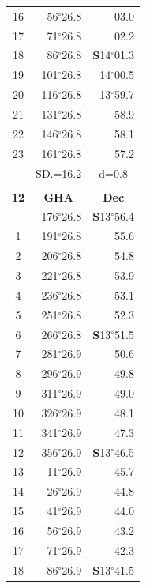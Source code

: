 \documentclass[10pt, a4paper]{report}
\begin{document}
\begin{scriptsize}
\begin{tabular*}{0.2\textwidth}[t]{@{\extracolsep{\fill}}|c|rr|}
16 & 56$^\circ$26.8 & 03.0\\
17 & 71$^\circ$26.8 & 02.2\\[2Pt]
18 & 86$^\circ$26.8 & \textbf{S}14$^\circ$01.3\\
19 & 101$^\circ$26.8 & 14$^\circ$00.5\\
20 & 116$^\circ$26.8 & 13$^\circ$59.7\\
21 & 131$^\circ$26.8 & \raisebox{0.24ex}{\boldmath$\cdot$~\boldmath$\cdot$~~}58.9\\
22 & 146$^\circ$26.8 & 58.1\\
23 & 161$^\circ$26.8 & 57.2\\
\hline
\rule{0pt}{2.4ex} & \multicolumn{1}{c}{SD.=16.2} & \multicolumn{1}{c|}{d=0.8}\\
\hline
\multicolumn{1}{c}{}\\[-0.5ex]\hline
\multicolumn{1}{|c|}{\rule{0pt}{2.6ex}\textbf{12}} & \multicolumn{1}{c}{\textbf{GHA}} & \multicolumn{1}{c|}{\textbf{Dec}}\\
\hline\rule{0pt}{2.6ex}\noindent
0 & 176$^\circ$26.8 & \textbf{S}13$^\circ$56.4\\
1 & 191$^\circ$26.8 & 55.6\\
2 & 206$^\circ$26.8 & 54.8\\
3 & 221$^\circ$26.8 & \raisebox{0.24ex}{\boldmath$\cdot$~\boldmath$\cdot$~~}53.9\\
4 & 236$^\circ$26.8 & 53.1\\
5 & 251$^\circ$26.8 & 52.3\\[2Pt]
6 & 266$^\circ$26.8 & \textbf{S}13$^\circ$51.5\\
7 & 281$^\circ$26.9 & 50.6\\
8 & 296$^\circ$26.9 & 49.8\\
9 & 311$^\circ$26.9 & \raisebox{0.24ex}{\boldmath$\cdot$~\boldmath$\cdot$~~}49.0\\
10 & 326$^\circ$26.9 & 48.1\\
11 & 341$^\circ$26.9 & 47.3\\[2Pt]
12 & 356$^\circ$26.9 & \textbf{S}13$^\circ$46.5\\
13 & 11$^\circ$26.9 & 45.7\\
14 & 26$^\circ$26.9 & 44.8\\
15 & 41$^\circ$26.9 & \raisebox{0.24ex}{\boldmath$\cdot$~\boldmath$\cdot$~~}44.0\\
16 & 56$^\circ$26.9 & 43.2\\
17 & 71$^\circ$26.9 & 42.3\\[2Pt]
18 & 86$^\circ$26.9 & \textbf{S}13$^\circ$41.5\\

\end{tabular*}
\end{scriptsize}
\end{document}
